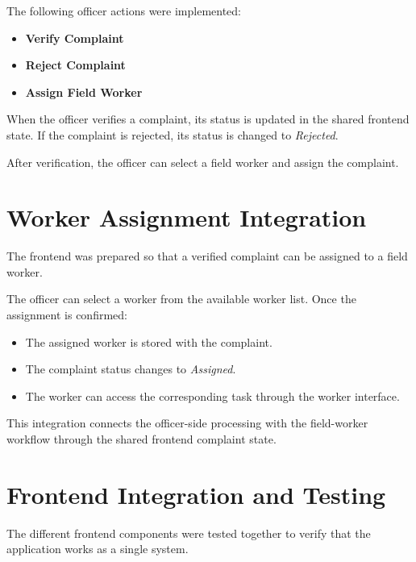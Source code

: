 \documentclass[12pt,a4paper]{article}
\begin{document}
The following officer actions were implemented:

\begin{itemize}
    \item \textbf{Verify Complaint}
    \item \textbf{Reject Complaint}
    \item \textbf{Assign Field Worker}
\end{itemize}

When the officer verifies a complaint, its status is updated in the shared
frontend state. If the complaint is rejected, its status is changed to
\textit{Rejected}.

After verification, the officer can select a field worker and assign the
complaint.

\section{Worker Assignment Integration}

The frontend was prepared so that a verified complaint can be assigned to a
field worker.

The officer can select a worker from the available worker list. Once the
assignment is confirmed:

\begin{itemize}
    \item The assigned worker is stored with the complaint.
    \item The complaint status changes to \textit{Assigned}.
    \item The worker can access the corresponding task through the worker
    interface.
\end{itemize}

This integration connects the officer-side processing with the field-worker
workflow through the shared frontend complaint state.

\section{Frontend Integration and Testing}

The different frontend components were tested together to verify that the
application works as a single system.
\end{document}

